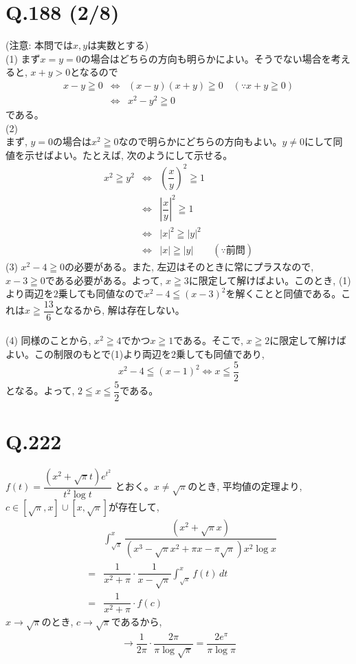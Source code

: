 \documentclass[twocolumn]{jbook}
\theoremstyle{definition}
\newcommand{\abs}[1]{\left|#1\right|}
\newcommand{\disp}{\displaystyle}
\newcommand{\dou}{\Leftrightarrow}
\newcommand{\beqn}{\begin{eqnarray*}}
\newcommand{\eeqn}{\end{eqnarray*}}
\renewcommand{\leq}{\leqq}
\renewcommand{\geq}{\geqq}
\newcommand{\parena}[1]{\left( #1\right)}
\begin{document}
\section*{Q.188 (2/8)}
(注意: 本問では$x,y$は実数とする)\\
(1) まず$x=y=0$の場合はどちらの方向も明らかによい。そうでない場合を考えると, $x+y > 0$となるので
\beqn
x-y\geq 0 &\dou& (x-y)(x+y)\geq 0\quad (\because x+y\geq 0)\\
&\dou& x^2 - y^2 \geq 0 
\eeqn
である。\\
(2) \\
まず, $y=0$の場合は$x^2\geq 0$なので明らかにどちらの方向もよい。$y\neq 0$にして同値を示せばよい。たとえば, 次のようにして示せる。
\beqn
x^2 \geq y^2 &\dou& \parena{\dfrac{x}{y}}^2 \geq 1\\
&\dou& \abs{\dfrac{x}{y}}^2 \geq 1\\
&\dou & |x|^2 \geq |y|^2\\
&\dou& |x| \geq |y|\qquad (\because \mbox{前問})
\eeqn
(3) $x^2 - 4\geq 0$の必要がある。また, 左辺はそのときに常にプラスなので, $x-3\geq 0$である必要がある。よって, $x\geq 3$に限定して解けばよい。このとき, (1)より両辺を$2$乗しても同値なので$x^2 - 4 \leq (x-3)^2$を解くことと同値である。これは$x\geq \dfrac{13}{6}$となるから, 解は存在しない。\\
\\
(4) 同様のことから, $x^2\geq 4$でかつ$x\geq 1$である。そこで, $x\geq 2$に限定して解けばよい。この制限のもとで(1)より両辺を$2$乗しても同値であり, 
\[ x^2-4 \leq (x-1)^2 \dou x\leq \dfrac{5}{2}\]
となる。よって, $2\leq x\leq \dfrac{5}{2}$である。

\section*{Q.222}
$f(t) = \dfrac{(x^2 + \sqrt{\pi}t)e^{t^2}}{t^2\log{t}}$ とおく。$x\neq \sqrt{\pi}$のとき, 平均値の定理より, $c\in [\sqrt{\pi},x]\cup [x,\sqrt{\pi}]$が存在して, 
\beqn
&&\disp\int_{\sqrt{\pi}}^{x} \dfrac{(x^2 + \sqrt{\pi}x)}{(x^3 - \sqrt{\pi}x^2 + \pi x - \pi\sqrt{\pi})x^2\log{x}}\\
&=& \dfrac{1}{x^2+\pi}\cdot \dfrac{1}{x-\sqrt{\pi}}\disp\int_{\sqrt{\pi}}^{x} f(t)\, dt\\
&=& \dfrac{1}{x^2+\pi}\cdot f(c)
\eeqn
$x\to \sqrt{\pi}$のとき, $c\to \sqrt{\pi}$であるから, 
\beqn
\to \dfrac{1}{2\pi}\cdot \dfrac{2\pi}{\pi\log{\sqrt{\pi}}} = \dfrac{2e^{\pi}}{\pi\log{\pi}}
\eeqn

\clearpage
\end{document}
